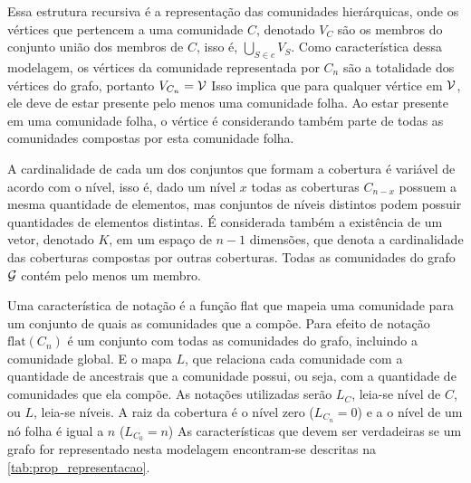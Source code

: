 \documentclass[notes.tex]{subfiles}
\begin{document}
Essa estrutura recursiva é a representação das comunidades hierárquicas, onde os vértices que pertencem a uma comunidade $C$, denotado $V_C$ são os membros do conjunto união dos membros de  $C$, isso é, $\bigcup_{S \in c} V_S$.
Como característica dessa modelagem, os vértices da comunidade representada por $C_n$ são a totalidade dos vértices do grafo, portanto $V_{C_n} = \operatorname{\mathcal{V}}$
Isso implica que para qualquer vértice em $\operatorname{\mathcal{V}}$, ele deve de estar presente pelo menos uma comunidade folha.
Ao estar presente em uma comunidade folha, o vértice é considerando também parte de todas as comunidades compostas por esta comunidade folha.

A cardinalidade de cada um dos conjuntos que formam a cobertura é variável de acordo com o nível, isso é, dado um nível $x$ todas as coberturas  $C_{n-x}$ possuem a mesma quantidade de elementos, mas conjuntos de níveis distintos podem possuir quantidades de elementos distintas.
É considerada também a existência de um vetor, denotado $K$, em um espaço de $n-1$ dimensões, que denota a cardinalidade das coberturas compostas por outras coberturas.
Todas as comunidades do grafo $\operatorname{\mathcal{G}}$ contém pelo menos um membro.

Uma característica de notação é a função flat que mapeia uma comunidade para um conjunto de quais as comunidades que a compõe.
Para efeito de notação $\text{flat}(C_n)$ é um conjunto com todas as comunidades do grafo, incluindo a comunidade global.
E o mapa $L$, que relaciona cada comunidade com a quantidade de ancestrais que a comunidade possui, ou seja, com a quantidade de comunidades que ela compõe.
As notações utilizadas serão  $L_C$, leia-se nível de $C$, ou $L$, leia-se níveis.
A raiz da cobertura é o nível zero ($L_{C_n} = 0$) e a o nível de um nó folha é igual a $n$ ($L_{C_0}=n$)
As características que devem ser verdadeiras se um grafo for representado nesta modelagem encontram-se descritas na \autoref{tab:prop_representacao}.
\end{document}
